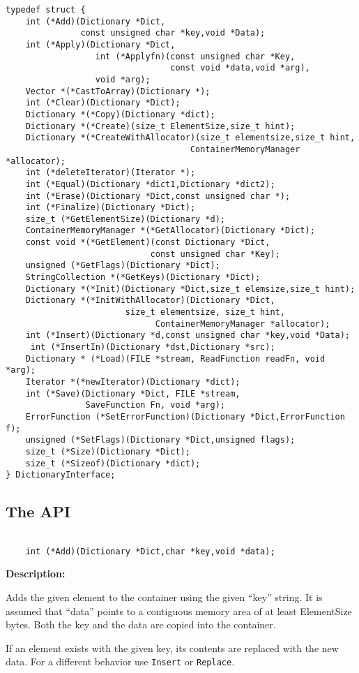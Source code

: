 \documentclass[12pt,a4paper]{memoir} %
\newcommand{\api}[1] {%
\par\vspace{0.4cm}
\addcontentsline{toc}{subsubsection}{#1}\index{#1}
\noindent {\large \textbf{#1}}\index{#1} \hrulefill[1pt][3.5pt]
\nopagebreak
\begin{verbatim}
}
\newcommand{\apidescription}{%
\par \noindent \textbf{Description:} %\par\noindent
}
\begin{document}
{{\begin{verbatim}
typedef struct {
    int (*Add)(Dictionary *Dict,
               const unsigned char *key,void *Data);
    int (*Apply)(Dictionary *Dict,
                  int (*Applyfn)(const unsigned char *Key,
                                 const void *data,void *arg),
                  void *arg);
    Vector *(*CastToArray)(Dictionary *);
    int (*Clear)(Dictionary *Dict);
    Dictionary *(*Copy)(Dictionary *dict);
    Dictionary *(*Create)(size_t ElementSize,size_t hint);
    Dictionary *(*CreateWithAllocator)(size_t elementsize,size_t hint,
                                     ContainerMemoryManager *allocator);
    int (*deleteIterator)(Iterator *);
    int (*Equal)(Dictionary *dict1,Dictionary *dict2);
    int (*Erase)(Dictionary *Dict,const unsigned char *);
    int (*Finalize)(Dictionary *Dict);
    size_t (*GetElementSize)(Dictionary *d);
    ContainerMemoryManager *(*GetAllocator)(Dictionary *Dict);
    const void *(*GetElement)(const Dictionary *Dict,
                             const unsigned char *Key);
    unsigned (*GetFlags)(Dictionary *Dict);
    StringCollection *(*GetKeys)(Dictionary *Dict);
    Dictionary *(*Init)(Dictionary *Dict,size_t elemsize,size_t hint);
    Dictionary *(*InitWithAllocator)(Dictionary *Dict,
                        size_t elementsize, size_t hint,
                              ContainerMemoryManager *allocator);
    int (*Insert)(Dictionary *d,const unsigned char *key,void *Data);
     int (*InsertIn)(Dictionary *dst,Dictionary *src);
    Dictionary * (*Load)(FILE *stream, ReadFunction readFn, void *arg);
    Iterator *(*newIterator)(Dictionary *dict);
    int (*Save)(Dictionary *Dict, FILE *stream, 
                SaveFunction Fn, void *arg);
    ErrorFunction (*SetErrorFunction)(Dictionary *Dict,ErrorFunction f);
    unsigned (*SetFlags)(Dictionary *Dict,unsigned flags);
    size_t (*Size)(Dictionary *Dict);
    size_t (*Sizeof)(Dictionary *dict);
} DictionaryInterface;
\end{verbatim}
\subsection{The API}
\api{Add}
    int (*Add)(Dictionary *Dict,char *key,void *data);
\end{verbatim}
\apidescription
Adds the given element to the container using the given “key” string. It is assumed that “data” points to a contiguous memory area of at least ElementSize bytes.  Both the key and the data are copied into the container.

If an element exists with the given key, its contents are replaced with the new data. For a different behavior use \texttt{Insert} or \texttt{Replace}.

}}
\end{document}
